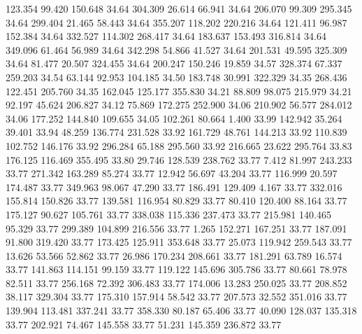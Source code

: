  123.354   99.420  150.648        34.64
 304.309   26.614   66.941        34.64
 206.070   99.309  295.345        34.64
 299.404   21.465   58.443        34.64
 355.207  118.202  220.216        34.64
 121.411   96.987  152.384        34.64
 332.527  114.302  268.417        34.64
 183.637  153.493  316.814        34.64
 349.096   61.464   56.989        34.64
 342.298   54.866   41.527        34.64
 201.531   49.595  325.309        34.64
  81.477   20.507  324.455        34.64
 200.247  150.246   19.859        34.57
 328.374   67.337  259.203        34.54
  63.144   92.953  104.185        34.50
 183.748   30.991  322.329        34.35
 268.436  122.451  205.760        34.35
 162.045  125.177  355.830        34.21
  88.809   98.075  215.979        34.21
  92.197   45.624  206.827        34.12
  75.869  172.275  252.900        34.06
 210.902   56.577  284.012        34.06
 177.252  144.840  109.655        34.05
 102.261   80.664    1.400        33.99
 142.942   35.264   39.401        33.94
  48.259  136.774  231.528        33.92
 161.729   48.761  144.213        33.92
 110.839  102.752  146.176        33.92
 296.284   65.188  295.560        33.92
 216.665   23.622  295.764        33.83
 176.125  116.469  355.495        33.80
  29.746  128.539  238.762        33.77
   7.412   81.997  243.233        33.77
 271.342  163.289   85.274        33.77
  12.942   56.697   43.204        33.77
 116.999   20.597  174.487        33.77
 349.963   98.067   47.290        33.77
 186.491  129.409    4.167        33.77
 332.016  155.814  150.826        33.77
 139.581  116.954   80.829        33.77
  80.410  120.400   88.164        33.77
 175.127   90.627  105.761        33.77
 338.038  115.336  237.473        33.77
 215.981  140.465   95.329        33.77
 299.389  104.899  216.556        33.77
   1.265  152.271  167.251        33.77
 187.091   91.800  319.420        33.77
 173.425  125.911  353.648        33.77
  25.073  119.942  259.543        33.77
  13.626   53.566   52.862        33.77
  26.986  170.234  208.661        33.77
 181.291   63.789   16.574        33.77
 141.863  114.151   99.159        33.77
 119.122  145.696  305.786        33.77
  80.661   78.978   82.511        33.77
 256.168   72.392  306.483        33.77
 174.006   13.283  250.025        33.77
 208.852   38.117  329.304        33.77
 175.310  157.914   58.542        33.77
 207.573   32.552  351.016        33.77
 139.904  113.481  337.241        33.77
 358.330   80.187   65.406        33.77
  40.090  128.037  135.318        33.77
 202.921   74.467  145.558        33.77
  51.231  145.359  236.872        33.77
